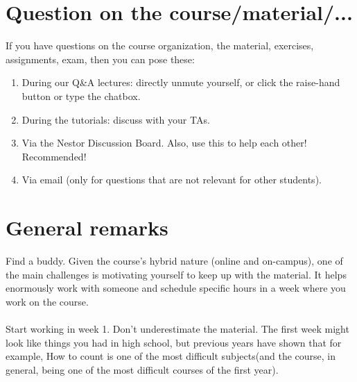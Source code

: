 \documentclass[openany]{article}
\begin{document}
\section{Question on the course/material/...}\label{section question}
 If you have questions on the course organization, the material, exercises,
 assignments, exam, then you can pose these:
 \begin{enumerate}
 	\item During our Q\&A lectures: directly unmute yourself, or click the raise-hand button or type the chatbox. 
 	\item During the tutorials: discuss with your TAs.
 	\item Via the Nestor Discussion Board. Also, use this to help each other! Recommended!
 	\item Via email (only for questions that are not relevant for other students).
 \end{enumerate}
\section{General remarks}
Find a buddy. Given the course's hybrid nature (online and on-campus), one of the main challenges is motivating yourself to keep up with the material. It helps enormously work with someone and schedule specific hours in a week where
you work on the course.\\~\\
Start working in week 1. Don't underestimate the material. The first week might look like things you had in high school, but previous years have
shown that for example, How to count is one of the most difficult subjects(and the course, in general, being one of the most difficult courses of the first
year).
\end{document}
